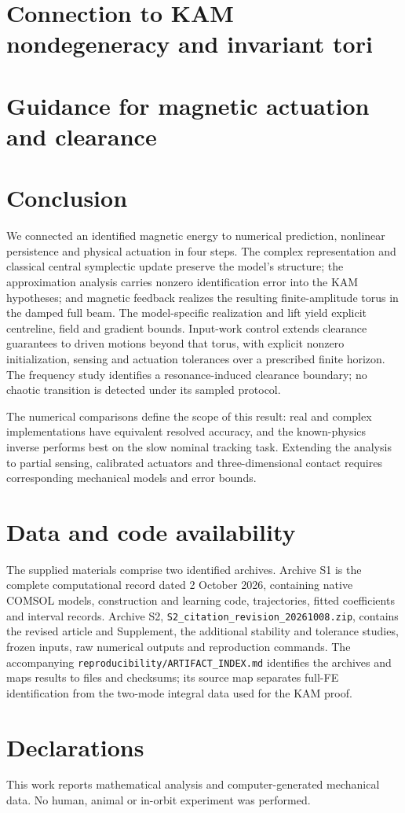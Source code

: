 \documentclass[doublespace,Afour,sageh,times]{sagej}
\theoremstyle{definition}
\begin{document}
\section{Connection to KAM nondegeneracy and invariant tori}
\label{sec:kam}

\section{Guidance for magnetic actuation and clearance}
\label{sec:application}

\clearpage
\section{Conclusion}
\label{sec:conclusion}
We connected an identified magnetic energy to numerical prediction, nonlinear persistence and physical actuation in four steps. The complex representation and classical central symplectic update preserve the model's structure; the approximation analysis carries nonzero identification error into the KAM hypotheses; and magnetic feedback realizes the resulting finite-amplitude torus in the damped full beam. The model-specific realization and lift yield explicit centreline, field and gradient bounds. Input-work control extends clearance guarantees to driven motions beyond that torus, with explicit nonzero initialization, sensing and actuation tolerances over a prescribed finite horizon. The frequency study identifies a resonance-induced clearance boundary; no chaotic transition is detected under its sampled protocol.

The numerical comparisons define the scope of this result: real and complex implementations have equivalent resolved accuracy, and the known-physics inverse performs best on the slow nominal tracking task. Extending the analysis to partial sensing, calibrated actuators and three-dimensional contact requires corresponding mechanical models and error bounds.

\section*{Data and code availability}
The supplied materials comprise two identified archives. Archive S1 is the complete computational record dated 2 October 2026, containing native COMSOL models, construction and learning code, trajectories, fitted coefficients and interval records. Archive S2, \texttt{S2\_citation\_revision\_20261008.zip}, contains the revised article and Supplement, the additional stability and tolerance studies, frozen inputs, raw numerical outputs and reproduction commands. The accompanying \texttt{reproducibility/ARTIFACT\_INDEX.md} identifies the archives and maps results to files and checksums; its source map separates full-FE identification from the two-mode integral data used for the KAM proof.
\section*{Declarations}
This work reports mathematical analysis and computer-generated mechanical data. No human, animal or in-orbit experiment was performed.

\end{document}
